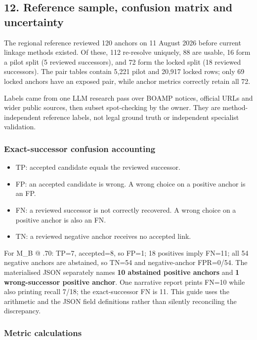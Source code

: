 \subsection{12. Reference sample, confusion matrix and
uncertainty}\label{12-reference-sample-confusion-matrix-and-uncertainty}

The regional reference reviewed 120 anchors on 11 August 2026 before
current linkage methods existed. Of these, 112 re-resolve uniquely, 88
are usable, 16 form a pilot split (5 reviewed successors), and 72 form
the locked split (18 reviewed successors). The pair tables contain 5,221
pilot and 20,917 locked rows; only 69 locked anchors have an exposed
pair, while anchor metrics correctly retain all 72.

Labels came from one LLM research pass over BOAMP notices, official URLs
and wider public sources, then subset spot-checking by the owner. They
are method-independent reference labels, not legal ground truth or
independent specialist validation.

\subsubsection{Exact-successor confusion
accounting}\label{exact-successor-confusion-accounting}

\begin{itemize}
\tightlist
\item
  TP: accepted candidate equals the reviewed successor.
\item
  FP: an accepted candidate is wrong. A wrong choice on a positive
  anchor is an FP.
\item
  FN: a reviewed successor is not correctly recovered. A wrong choice on
  a positive anchor is also an FN.
\item
  TN: a reviewed negative anchor receives no accepted link.
\end{itemize}

For M\_B @ .70: TP=7, accepted=8, so FP=1; 18 positives imply FN=11; all
54 negative anchors are abstained, so TN=54 and negative-anchor
FPR=0/54. The materialised JSON separately names \textbf{10 abstained
positive anchors} and \textbf{1 wrong-successor positive anchor}. One
narrative report prints FN=10 while also printing recall 7/18; the
exact-successor FN is 11. This guide uses the arithmetic and the JSON
field definitions rather than silently reconciling the discrepancy.

\subsubsection{Metric calculations}\label{metric-calculations}

